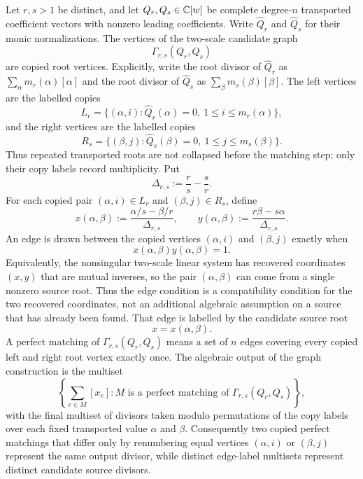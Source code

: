 \begin{definition}\label{def:two-scale-candidate-graph}
Let \(r,s>1\) be distinct, and let \(Q_r,Q_s\in\mathbb{C}[w]\) be complete
degree-\(n\) transported coefficient vectors with nonzero leading
coefficients.  Write \(\widehat Q_r\) and \(\widehat Q_s\) for their
monic normalizations.  The vertices of the two-scale candidate graph
\[
\Gamma_{r,s}(Q_r,Q_s)
\]
are copied root vertices.  Explicitly, write the root divisor of
\(\widehat Q_r\) as \(\sum_{\alpha}m_r(\alpha)[\alpha]\) and the root
divisor of \(\widehat Q_s\) as
\(\sum_{\beta}m_s(\beta)[\beta]\).  The left vertices are the labelled
copies
\[
L_r=\{(\alpha,i):\widehat Q_r(\alpha)=0,\ 1\le i\le m_r(\alpha)\},
\]
and the right vertices are the labelled copies
\[
R_s=\{(\beta,j):\widehat Q_s(\beta)=0,\ 1\le j\le m_s(\beta)\}.
\]
Thus repeated transported roots are not collapsed before the matching
step; only their copy labels record multiplicity.  Put
\[
\Delta_{r,s}:=\frac r s-\frac s r .
\]
For each copied pair \((\alpha,i)\in L_r\) and
\((\beta,j)\in R_s\), define
\[
x(\alpha,\beta):=
\frac{\alpha/s-\beta/r}{\Delta_{r,s}},
\qquad
y(\alpha,\beta):=
\frac{r\beta-s\alpha}{\Delta_{r,s}}.
\]
An edge is drawn between the copied vertices \((\alpha,i)\) and
\((\beta,j)\) exactly when
\[
x(\alpha,\beta)y(\alpha,\beta)=1.
\]
Equivalently, the nonsingular two-scale linear system has recovered
coordinates \((x,y)\) that are mutual inverses, so the pair
\((\alpha,\beta)\) can come from a single nonzero source root.  Thus
the edge condition is a compatibility condition for the two recovered
coordinates, not an additional algebraic assumption on a source that
has already been found.
That edge is labelled by the candidate source root
\[
x=x(\alpha,\beta).
\]
A perfect matching of \(\Gamma_{r,s}(Q_r,Q_s)\) means a set of \(n\)
edges covering every copied left and right root vertex exactly once.
The algebraic output of the graph construction is the multiset
\[
\left\{\sum_{e\in M}[x_e]:
  M\text{ is a perfect matching of }\Gamma_{r,s}(Q_r,Q_s)\right\},
\]
with the final multiset of divisors taken modulo permutations of the
copy labels over each fixed transported value \(\alpha\) and \(\beta\).
Consequently two copied perfect matchings that differ only by
renumbering equal vertices \((\alpha,i)\) or \((\beta,j)\) represent
the same output divisor, while distinct edge-label multisets represent
distinct candidate source divisors.
\end{definition}

